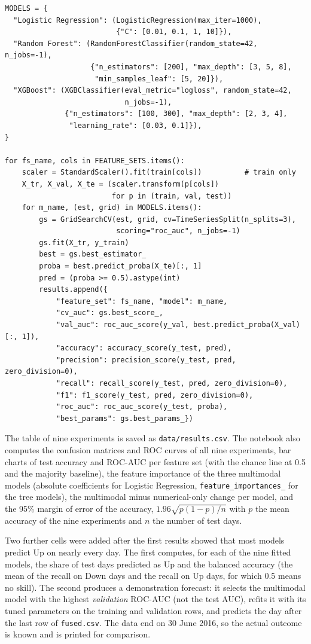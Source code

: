 \begin{lstlisting}[float=!htbp, caption={Model tuning and test evaluation (Step 5).}, label={lst:train}]
MODELS = {
  "Logistic Regression": (LogisticRegression(max_iter=1000),
                          {"C": [0.01, 0.1, 1, 10]}),
  "Random Forest": (RandomForestClassifier(random_state=42, n_jobs=-1),
                    {"n_estimators": [200], "max_depth": [3, 5, 8],
                     "min_samples_leaf": [5, 20]}),
  "XGBoost": (XGBClassifier(eval_metric="logloss", random_state=42,
                            n_jobs=-1),
              {"n_estimators": [100, 300], "max_depth": [2, 3, 4],
               "learning_rate": [0.03, 0.1]}),
}

for fs_name, cols in FEATURE_SETS.items():
    scaler = StandardScaler().fit(train[cols])          # train only
    X_tr, X_val, X_te = (scaler.transform(p[cols])
                         for p in (train, val, test))
    for m_name, (est, grid) in MODELS.items():
        gs = GridSearchCV(est, grid, cv=TimeSeriesSplit(n_splits=3),
                          scoring="roc_auc", n_jobs=-1)
        gs.fit(X_tr, y_train)
        best = gs.best_estimator_
        proba = best.predict_proba(X_te)[:, 1]
        pred = (proba >= 0.5).astype(int)
        results.append({
            "feature_set": fs_name, "model": m_name,
            "cv_auc": gs.best_score_,
            "val_auc": roc_auc_score(y_val, best.predict_proba(X_val)[:, 1]),
            "accuracy": accuracy_score(y_test, pred),
            "precision": precision_score(y_test, pred, zero_division=0),
            "recall": recall_score(y_test, pred, zero_division=0),
            "f1": f1_score(y_test, pred, zero_division=0),
            "roc_auc": roc_auc_score(y_test, proba),
            "best_params": gs.best_params_})
\end{lstlisting}

The table of nine experiments is saved as \texttt{data/results.csv}. The notebook also computes the confusion matrices and ROC curves of all nine experiments, bar charts of test accuracy and ROC-AUC per feature set (with the chance line at 0.5 and the majority baseline), the feature importance of the three multimodal models (absolute coefficients for Logistic Regression, \texttt{feature\_importances\_} for the tree models), the multimodal minus numerical-only change per model, and the 95\% margin of error of the accuracy, $1.96\sqrt{p(1-p)/n}$ with $p$ the mean accuracy of the nine experiments and $n$ the number of test days.

Two further cells were added after the first results showed that most models predict Up on nearly every day. The first computes, for each of the nine fitted models, the share of test days predicted as Up and the balanced accuracy (the mean of the recall on Down days and the recall on Up days, for which 0.5 means no skill). The second produces a demonstration forecast: it selects the multimodal model with the highest \emph{validation} ROC-AUC (not the test AUC), refits it with its tuned parameters on the training and validation rows, and predicts the day after the last row of \texttt{fused.csv}. The data end on 30 June 2016, so the actual outcome is known and is printed for comparison.

